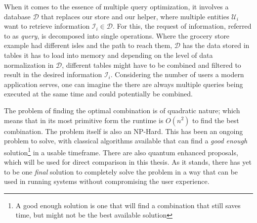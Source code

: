 When it comes to the essence of multiple query optimization, it involves a database $\mathcal{D}$ that replaces our store and our helper, where multiple entities $\mathcal{U}_i$ want to retrieve information $\mathcal{I}_i \in \mathcal{D}$. For this, the request of information, referred to as \emph{query}, is decomposed into single operations. Where the grocery store example had different isles and the path to reach them, $\mathcal{D}$ has the data stored in tables it has to load into memory and depending on the level of data normalization in $\mathcal{D}$\cite{semantic_relational_data_model}, different tables might have to be combined and filtered to result in the desired information $\mathcal{I}_i$. Considering the number of users a modern application serves\cite{uber_technologies_inc_uber_2022}, one can imagine the there are always multiple queries being executed at the same time and could potentially be combined.\par
The problem of finding the optimal combination is of quadratic nature; which means that in its most primitive form the runtime is $O(n^2)$ to find the best combination. The problem itself is also an NP-Hard\cite{sellis_multiple-query_1990}. This has been an ongoing problem to solve, with classical algorithms\cite{kathuria_provable_mqo} available that can find a \emph{good enough} solution\footnote{A good enough solution is one that will find a combination that still saves time, but might not be the best available solution} in a usable timeframe. There are also quantum enhanced proposals\cite{fankhauser_multiple_2021}, which will be used for direct comparison in this thesis. As it stands, there has yet to be one \emph{final} solution to completely solve the problem in a way that can be used in running systems without compromising the user experience.


